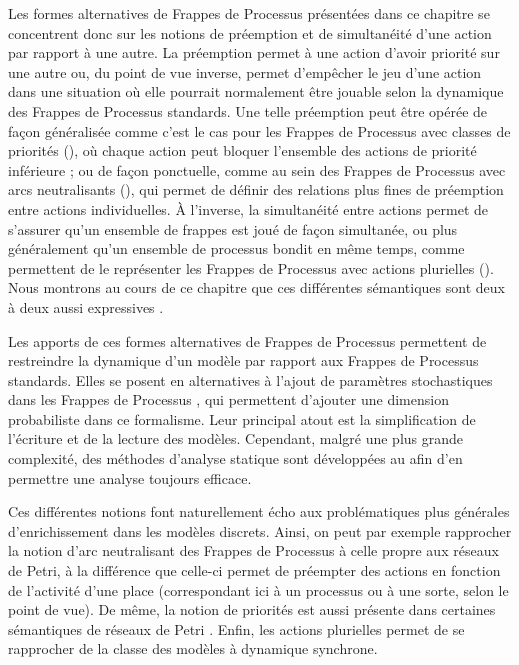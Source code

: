 Les formes alternatives de Frappes de Processus présentées dans ce chapitre se concentrent donc
sur les notions de préemption et de simultanéité d'une action par rapport à une autre.
La préemption permet à une action d'avoir priorité sur une autre ou, du point de vue inverse,
permet d'empêcher le jeu d'une action dans une situation où elle pourrait normalement être jouable
selon la dynamique des Frappes de Processus standards.
Une telle préemption peut être opérée de façon généralisée
comme c'est le cas pour les Frappes de Processus avec classes de priorités (),
où chaque action peut bloquer l'ensemble des actions de priorité inférieure ;
ou de façon ponctuelle, comme au sein des Frappes de Processus avec arcs neutralisants
(),
qui permet de définir des relations plus fines de préemption entre actions individuelles.
À l'inverse, la simultanéité entre actions permet de s'assurer qu'un ensemble de frappes est joué
de façon simultanée, ou plus généralement qu'un ensemble de processus bondit en même temps,
comme permettent de le représenter les Frappes de Processus avec actions plurielles ().
Nous montrons au cours de ce chapitre que ces différentes sémantiques sont deux à deux aussi
expressives .

Les apports de ces formes alternatives de Frappes de Processus permettent de restreindre
la dynamique
d'un modèle par rapport aux Frappes de Processus standards.
Elles se posent en alternatives à l'ajout de paramètres stochastiques dans les Frappes de Processus
,
qui permettent d'ajouter une dimension probabiliste dans ce formalisme.
Leur principal atout est la simplification de l'écriture et de la lecture des modèles.
Cependant, malgré une plus grande complexité, des méthodes d'analyse statique sont
développées au  afin d'en permettre une analyse toujours efficace.

Ces différentes notions font naturellement écho aux problématiques plus générales d'enrichissement
dans les modèles discrets.
Ainsi, on peut par exemple rapprocher la notion d'arc neutralisant des Frappes de Processus
à celle propre aux réseaux de Petri,
à la différence que celle-ci permet de préempter des actions en fonction de l'activité
d'une place (correspondant ici à un processus ou à une sorte, selon le point de vue).
De même, la notion de priorités est aussi présente dans certaines sémantiques de réseaux
de Petri \toref.
Enfin, les actions plurielles permet de se rapprocher de la classe des modèles
à dynamique synchrone.

